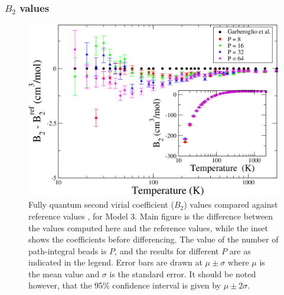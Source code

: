             \subsubsection{$B_2$ values}
                \begin{figure}[!htbp]
                    \centering
                    \includegraphics[scale=0.20,keepaspectratio]{Chapter-4/Figures/s3GarberoglioAll.png}
                    \caption{Fully quantum second virial coefficient ($B_2$) values compared against reference values \cite{Garberoglio2014}, for Model 3. Main figure is the difference between the values computed here and the reference values, while the inset shows the coefficients before differencing. The value of the number of path-integral beads is $P$, and the results for different $P$ are as indicated in the legend. Error bars are drawn at $\mu \pm \sigma$ where $\mu$ is the mean value and $\sigma$ is the standard error. It should be noted however, that the 95\% confidence interval is given by $\mu \pm 2\sigma$.}
                    \label{fig:variable}
                \end{figure}
                
